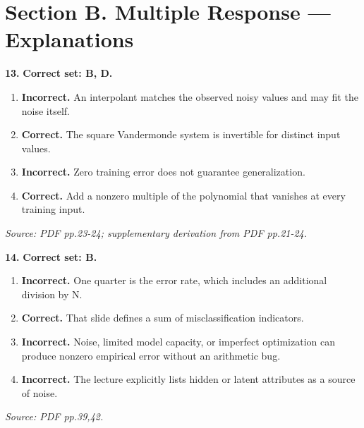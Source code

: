 \documentclass[11pt,a4paper]{article}
\begin{document}
\newpage\section*{Section B. Multiple Response --- Explanations}
\par\noindent\begin{minipage}{\linewidth}
\textbf{13.} \textbf{Correct set: B, D.}
\begin{enumerate}[label=(\Alph*),leftmargin=8mm,itemsep=2pt,topsep=2pt]
\item \textbf{Incorrect.} An interpolant matches the observed noisy values and may fit the noise itself.
\item \textbf{Correct.} The square Vandermonde system is invertible for distinct input values.
\item \textbf{Incorrect.} Zero training error does not guarantee generalization.
\item \textbf{Correct.} Add a nonzero multiple of the polynomial that vanishes at every training input.
\end{enumerate}
{\footnotesize\textit{Source: PDF pp.23-24; supplementary derivation from PDF pp.21-24.}}

\end{minipage}\par\vspace{3mm}
\par\noindent\begin{minipage}{\linewidth}
\textbf{14.} \textbf{Correct set: B.}
\begin{enumerate}[label=(\Alph*),leftmargin=8mm,itemsep=2pt,topsep=2pt]
\item \textbf{Incorrect.} One quarter is the error rate, which includes an additional division by N.
\item \textbf{Correct.} That slide defines a sum of misclassification indicators.
\item \textbf{Incorrect.} Noise, limited model capacity, or imperfect optimization can produce nonzero empirical error without an arithmetic bug.
\item \textbf{Incorrect.} The lecture explicitly lists hidden or latent attributes as a source of noise.
\end{enumerate}
{\footnotesize\textit{Source: PDF pp.39,42.}}

\end{minipage}\par\vspace{3mm}
\end{document}
